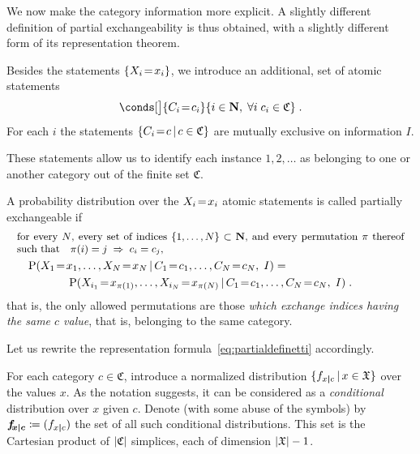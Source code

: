 \documentclass[\ifafour a4paper,12pt,\else a5paper,10pt,\fi%
onecolumn,oneside,article,%
british%
]{memoir}
\theoremstyle{remark}
\theoremstyle{innote}
\newcommand*{\NN}{\bm{\mathrm{N}}}
\newcommand*{\defd}{\coloneqq}
\DeclarePairedDelimiter\abs{\lvert}{\rvert}
\DeclarePairedDelimiter\set{\{}{\}}
\newcommand*{\p}{\mathrm{P}}%
\renewcommand*{\|}[1][]{\nonscript\,#1\vert\nonscript\,\mathopen{}}
\newcommand*{\sect}{\S}%
\newcommand*{\mathbox}[2][.8]{\parbox[b]{#1\columnwidth}{#2}}
\renewcommand*{\=}{\TextOrMath\texteq\eq}
\newcommand*{\X}[1]{X_{#1}}
\newcommand*{\x}[1]{x_{#1}}
\newcommand*{\C}[1]{C_{#1}}
\newcommand*{\cc}[1]{c_{#1}}
\newcommand*{\sX}{\mathfrak{X}}
\newcommand*{\sC}{\mathfrak{C}}
\newcommand*{\fxc}{\bm{f_{\!x\bcond c}}}
\newcommand*{\bcond}[1][]{\nonscript\,#1\bm{\vert}\nonscript\;\mathopen{}}
\begin{document}
We now make the category information more explicit. A slightly different
definition of partial exchangeability is thus obtained, with a slightly
different form of its representation theorem.



Besides the statements $\set{\X{i}\=\x{i}}$, we introduce an additional,
set of atomic statements
\begin{equation}
  \label{eq:category_statements}
  \conds[\big]{\C{i}\=\cc{i}}{i \in \NN,\;
 \forall i\;\cc{i} \in \sC} \;.
\end{equation}
For each $i$ the statements $\set{\C{i}\=c \| c \in \sC}$ are mutually
exclusive on information $I$.

These statements allow us to identify each instance $1,2,\dotsc$ as
belonging to one or another category out of the finite set $\sC$.

A probability distribution over the $\X{i}\=\x{i}$ atomic statements
is called partially exchangeable if
\begin{multline}
  \label{eq:part_exchangeable}
  \mathbox[0.99]{\small for every $N$, every set of indices $\set{1, \dotsc,
      N}\subset \NN$, and every permutation $\pi$ thereof such that\quad
    $\pi(i)=j \mathrel{\;\Rightarrow\;} \cc{i}=\cc{j}$,}
  \\
\shoveleft{\p( \X{1}\=\x{1}, \dotsc, \X{N}\=\x{N}  \|
  \C{1}\=\cc{1}, \dotsc,\C{N}\=\cc{N},\;    I) ={}}\\
\p( \X{i_{1}}\=\x{\pi(1)}, \dotsc, \X{i_{N}}\=\x{\pi(N)}   \|
    \C{1}\=\cc{1}, \dotsc,\C{N}\=\cc{N},\;    I) \;.
\end{multline}
that is, the only allowed permutations are those \emph{which exchange
  indices having the same $c$ value}, that is, belonging to the same
category.


Let us rewrite the representation formula~\eqref{eq:partialdefinetti}
accordingly.


For each category $c \in \sC$, introduce a normalized distribution
$\set{f_{x \bcond c} \| x \in \sX}$ over the values $x$. As the notation
suggests, it can be considered as a \emph{conditional} distribution over
$x$ given $c$. Denote (with some abuse of the symbols) by
$\fxc \defd (f_{x \bcond c})$ the set of all such conditional
distributions. This set is the Cartesian product of $\abs{\sC}$ simplices,
each of dimension $\abs{\sX}-1$.
\end{document}
